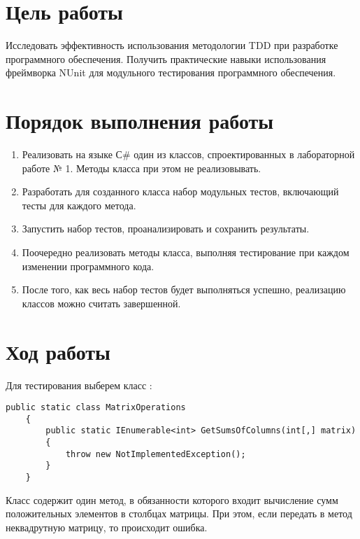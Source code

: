 \documentclass[a4paper,14pt]{extarticle}
\begin{document}

\section{Цель работы}
Исследовать эффективность использования методологии TDD при разработке
программного обеспечения. Получить практические навыки использования
фреймворка NUnit для модульного тестирования программного обеспечения.

\section{Порядок выполнения работы}
\begin{enumerate}
    \item Реализовать на языке С# один из классов, спроектированных в лабораторной
    работе № 1. Методы класса при этом не реализовывать.
    \item Разработать для созданного класса набор модульных тестов,
    включающий тесты для каждого метода.
    \item Запустить набор тестов, проанализировать и сохранить результаты.
    \item Поочередно реализовать методы класса, выполняя тестирование при
    каждом изменении программного кода.
    \item После того, как весь набор тестов будет выполняться успешно,
    реализацию классов можно считать завершенной.
\end{enumerate}

\section{Ход работы}
Для тестирования выберем класс :
\begin{lstlisting}
public static class MatrixOperations
    {
        public static IEnumerable<int> GetSumsOfColumns(int[,] matrix)
        {
            throw new NotImplementedException();
        }
    }
\end{lstlisting}

Класс содержит один метод, в обязанности которого входит вычисление сумм 
положительных элементов в столбцах матрицы. При этом, если передать в метод
неквадрутную матрицу, то происходит ошибка.
\end{document}
